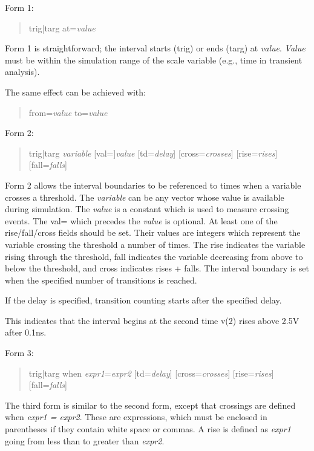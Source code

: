 Form 1:
\begin{quote}\vt
    trig|targ at={\it value}
\end{quote}

Form 1 is straightforward; the interval starts ({\vt trig}) or ends
({\vt targ}) at {\it value}.  {\it Value} must be within the
simulation range of the scale variable (e.g., time in transient
analysis).

The same effect can be achieved with:
\begin{quote}\vt
    from={\it value} to={\it value}
\end{quote}

Form 2:
\begin{quote}\vt
    trig|targ {\it variable} [val=]{\it value}
        [td={\it delay}] [cross={\it crosses}]
        [rise={\it rises}] [fall={\it falls}]
\end{quote}

Form 2 allows the interval boundaries to be referenced to times when a
variable crosses a threshold.  The {\it variable} can be any vector
whose value is available during simulation.  The {\it value} is a
constant which is used to measure crossing events.  The {\vt val=}
which precedes the {\it value} is optional.  At least one of the {\vt
rise/fall/cross} fields should be set.  Their values are integers
which represent the variable crossing the threshold a number of times. 
The {\vt rise} indicates the variable rising through the threshold,
{\vt fall} indicates the variable decreasing from above to below the
threshold, and {\vt cross} indicates {\vt rises + falls}.  The
interval boundary is set when the specified number of transitions is
reached.

If the delay is specified, transition counting starts after the
specified delay.


This indicates that the interval begins at the second time {\vt v(2)} rises
above 2.5V after 0.1ns.

Form 3:
\begin{quote}\vt
    trig|targ when {\it expr1\/}={\it expr2} [td={\it delay}]
        [cross={\it crosses}] [rise={\it rises}] [fall={\it falls}]
\end{quote}

The third form is similar to the second form, except that crossings
are defined when {\it expr1 = expr2}.  These are expressions, which
must be enclosed in parentheses if they contain white space or commas. 
A rise is defined as {\it expr1} going from less than to greater than
{\it expr2}.

